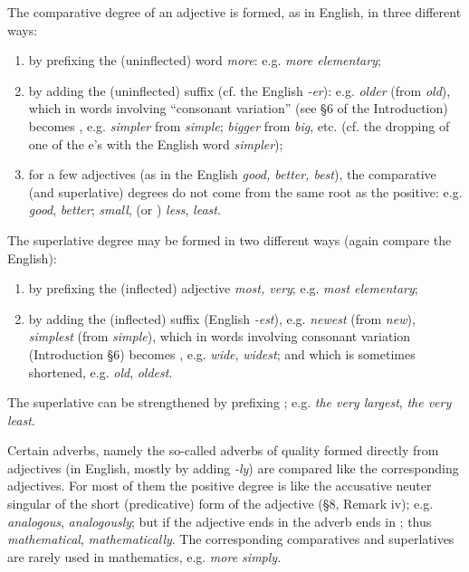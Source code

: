 The comparative degree of an adjective is formed, as in English, in three different ways:
\begin{enumerate}[label=\roman*)]
\item by prefixing the (uninflected) word  \emph{more}: e.g.  \emph{more elementary};
\item by adding the (uninflected) suffix  (cf. the English \emph{-er}): e.g.  \emph{older} (from  \emph{old}), which in words involving ``consonant variation'' (see §6 of the Introduction) becomes , e.g.  \emph{simpler} from  \emph{simple};  \emph{bigger} from  \emph{big}, etc. (cf. the dropping of one of the e's with the English word \emph{simpler});
\item for a few adjectives (as in the English \emph{good, better, best}), the comparative (and superlative) degrees do not come from the same root as the positive: e.g.  \emph{good},  \emph{better};  \emph{small},  (or ) \emph{less},  \emph{least}.
\end{enumerate}

The superlative degree may be formed in two different ways (again compare the English):
\begin{enumerate}[label=\roman*)]
\item by prefixing the (inflected) adjective  \emph{most, very}; e.g.  \emph{most elementary};
\item by adding the (inflected) suffix  (English \emph{-est}), e.g.  \emph{newest} (from  \emph{new}),  \emph{simplest} (from  \emph{simple}), which in words involving consonant variation (Introduction §6) becomes , e.g.  \emph{wide},  \emph{widest}; and which is sometimes shortened, e.g.  \emph{old},  \emph{oldest}.
\end{enumerate}

The superlative can be strengthened by prefixing ; e.g.  \emph{the very largest},  \emph{the very least}.

Certain adverbs, namely the so-called adverbs of quality formed directly from adjectives (in English, mostly by adding \emph{-ly}) are compared like the corresponding adjectives. For most of them the positive degree is like the accusative neuter singular of the short (predicative) form of the adjective (§8, Remark iv); e.g.  \emph{analogous},  \emph{analogously}; but if the adjective ends in  the adverb ends in ; thus  \emph{mathematical},  \emph{mathematically}. The corresponding comparatives and superlatives are rarely used in mathematics, e.g.  \emph{more simply}.

